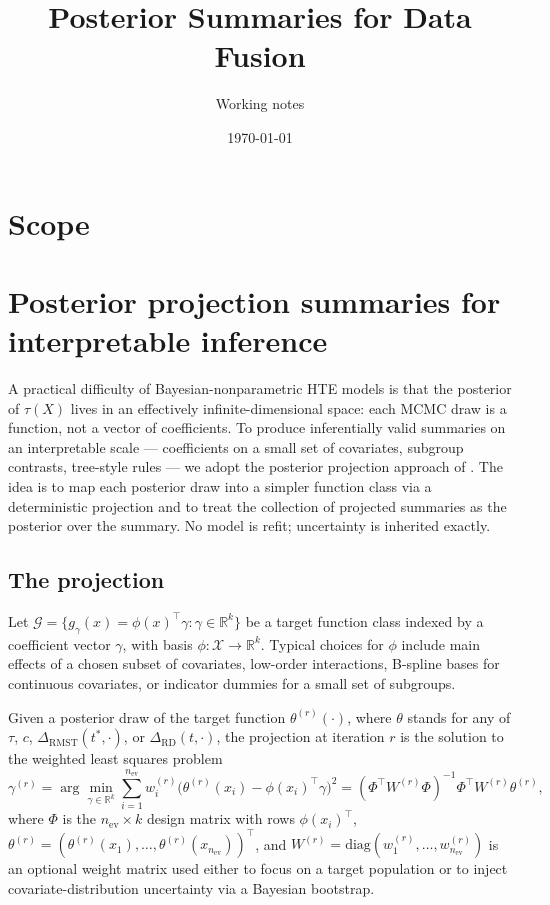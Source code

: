 \documentclass[11pt]{article}
\title{Posterior Summaries for Data Fusion}
\author{Working notes}
\date{\today}
\newcommand{\X}{X}
\newcommand{\tauf}{\tau}
\newcommand{\cf}{c}
\newcommand{\RMST}{\mathrm{RMST}}
\newcommand{\RD}{\mathrm{RD}}
\begin{document}
\maketitle

\section*{Scope}



\section{Posterior projection summaries for interpretable inference}

A practical difficulty of Bayesian-nonparametric HTE models is that the
posterior of $\tauf(\X)$ lives in an effectively infinite-dimensional space:
each MCMC draw is a function, not a vector of coefficients. To produce
inferentially valid summaries on an interpretable scale --- coefficients on
a small set of covariates, subgroup contrasts, tree-style rules --- we adopt
the posterior projection approach of \citet{Woody2020}. The idea is to map
each posterior draw into a simpler function class via a deterministic
projection and to treat the collection of projected summaries as the
posterior over the summary. No model is refit; uncertainty is inherited
exactly.

\subsection{The projection}

Let $\mathcal{G} = \{g_{\gamma}(x) = \phi(x)^{\top}\gamma : \gamma \in
\mathbb{R}^{k}\}$ be a target function class indexed by a coefficient vector
$\gamma$, with basis $\phi : \mathcal{X} \to \mathbb{R}^{k}$. Typical
choices for $\phi$ include main effects of a chosen subset of covariates,
low-order interactions, B-spline bases for continuous covariates, or
indicator dummies for a small set of subgroups.

Given a posterior draw of the target function $\theta^{(r)}(\cdot)$, where
$\theta$ stands for any of $\tauf$, $\cf$, $\Delta_{\RMST}(t^{*}, \cdot)$, or
$\Delta_{\RD}(t, \cdot)$, the projection at iteration $r$ is the solution to
the weighted least squares problem
\begin{equation}
  \gamma^{(r)} = \arg\min_{\gamma \in \mathbb{R}^{k}}
  \sum_{i=1}^{n_{\mathrm{ev}}}
  w_{i}^{(r)}\bigl(\theta^{(r)}(x_{i}) - \phi(x_{i})^{\top}\gamma\bigr)^{2}
  = (\Phi^{\top} W^{(r)} \Phi)^{-1}\Phi^{\top} W^{(r)} \theta^{(r)},
  \label{eq:projection}
\end{equation}
where $\Phi$ is the $n_{\mathrm{ev}} \times k$ design matrix with rows
$\phi(x_{i})^{\top}$, $\theta^{(r)} = (\theta^{(r)}(x_{1}), \ldots,
\theta^{(r)}(x_{n_{\mathrm{ev}}}))^{\top}$, and $W^{(r)} =
\mathrm{diag}(w_{1}^{(r)}, \ldots, w_{n_{\mathrm{ev}}}^{(r)})$ is an
optional weight matrix used either to focus on a target population or to
inject covariate-distribution uncertainty via a Bayesian bootstrap.
\end{document}

